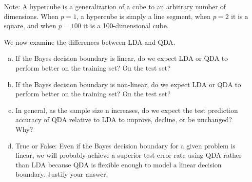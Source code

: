 \documentclass[14pt]{elegantbook}
\begin{document}
\begin{exercise*}[4.4]
\begin{enumerate}[(a)]
    Note: A hypercube is a generalization of a cube to an arbitrary number of dimensions. When $p = 1$, a hypercube is simply a line segment, when $p = 2$ it is a square, and when $p = 100$ it is a 100-dimensional cube. 
  \end{enumerate}
\end{exercise*}

\begin{solution}

\end{solution}

\begin{exercise*}[4.5]
  We now examine the differences between LDA and QDA. 
  \begin{enumerate}[(a)]
    \item If the Bayes decision boundary is linear, do we expect LDA or QDA to perform better on the training set? On the test set? 
    \item If the Bayes decision boundary is non-linear, do we expect LDA or QDA to perform better on the training set? On the test set?
    \item In general, as the sample size n increases, do we expect the test prediction accuracy of QDA relative to LDA to improve, decline, or be unchanged? Why?
    \item True or False: Even if the Bayes decision boundary for a given problem is linear, we will probably achieve a superior test error rate using QDA rather than LDA because QDA is flexible enough to model a linear decision boundary. Justify your answer. 
  \end{enumerate}
\end{exercise*}

\begin{solution}

\end{solution}
\end{document}
